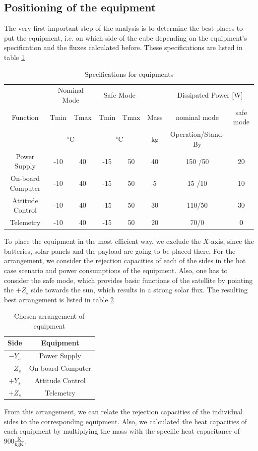 \subsection{Positioning of the equipment}
The very first important step of the analysis is to determine the best places to put the equipment, i.e. on which side of the cube depending on the equipment's specification and the fluxes calculated before. These specifications are listed in table \ref{tab:equipmentspecification}

\begin{table}[h!]
\centering
\begin{tabular}{ | c| c|c|c|c|c|c|c| }
\hline 
&  \multicolumn{2}{|c|}{Nominal Mode} &  \multicolumn{2}{|c|}{Safe Mode} & & \multicolumn{2}{|c|}{Dissipated Power [W] }\\
Function & Tmin & Tmax & Tmin & Tmax & Mass & nominal mode & safe mode  \\
& \multicolumn{2}{|c|}{$^{\circ}$C} & \multicolumn{2}{|c|}{$^{\circ}$C} & kg &Operation/Stand-By &  \\  \hline

Power Supply &-10   & 40  & -15&50  & 40  &  150 /50 & 20  \\ \hline
On-board Computer &-10  & 40 &-15 &50 &5 &15 /10& 10 \\ \hline
Attitude Control &-10  &40 & -15& 50&30 &110/50 &30  \\ \hline
Telemetry &-10  &40 &-15 &50 &20 &70/0 & 0  \\ \hline
\end{tabular}
\caption{Specifications for equipments}
\label{tab:equipmentspecification}
\end{table}

To place the equipment in the most efficient way, we exclude the $X$-axis, since the batteries, solar panels and the payload are going to be placed there. For the arrangement, we consider the rejection capacities of each of the sides in the hot case scenario and power consumptions of the equipment. Also, one has to consider the safe mode, which provides basic functions of the satellite by pointing the +$Z_{s}$ side towards the sun, which results in a strong solar flux. The resulting best arrangement is listed in table \ref{tab:arrangement}

\begin{table}[H]
\centering
\begin{tabular}{ | c| c|}
\hline 
Side & Equipment  \\ \hline
$-Y_{s}$ & Power Supply  \\ \hline
$-Z_{s}$ &On-board Computer \\\hline
$+Y_{s}$ &Attitude Control \\ \hline
$+Z_{s}$ &Telemetry   \\ \hline
\end{tabular}
\caption{Chosen arrangement of equipment}
\label{tab:arrangement}
\end{table}
From this arrangement, we can relate the rejection capacities of the individual sides to the corresponding equipment. Also, we calculated the heat capacities of each equipment by multiplying the mass with the specific heat capacitance of $900\frac{\mathrm{K}}{\mathrm{kgK}}$.


